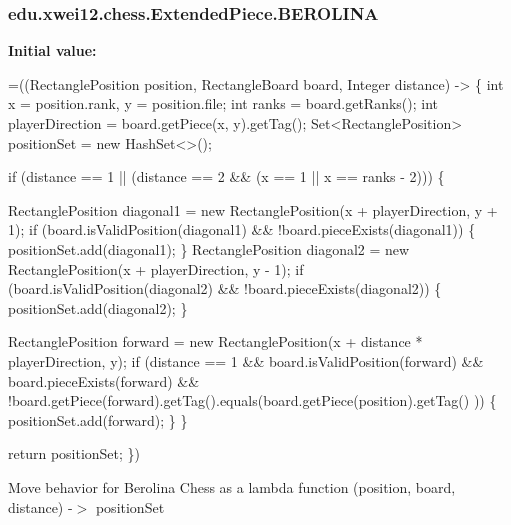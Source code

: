 \subsubsection[{\texorpdfstring{B\+E\+R\+O\+L\+I\+NA}{BEROLINA}}]{\setlength{\rightskip}{0pt plus 5cm}edu.\+xwei12.\+chess.\+Extended\+Piece.\+B\+E\+R\+O\+L\+I\+NA}\hypertarget{enumedu_1_1xwei12_1_1chess_1_1_extended_piece_ab5339557b124dc900e571d2d8451409e}{}\label{enumedu_1_1xwei12_1_1chess_1_1_extended_piece_ab5339557b124dc900e571d2d8451409e}
{\bfseries Initial value\+:}
\begin{DoxyCode}
=((RectanglePosition position, RectangleBoard board, Integer distance) -> \{
        \textcolor{keywordtype}{int} x = position.rank, y = position.file;
        \textcolor{keywordtype}{int} ranks = board.getRanks();
        \textcolor{keywordtype}{int} playerDirection = board.getPiece(x, y).getTag();
        Set<RectanglePosition> positionSet = \textcolor{keyword}{new} HashSet<>();

        
        \textcolor{keywordflow}{if} (distance == 1 || (distance == 2 && (x == 1 || x == ranks - 2))) \{

            
            RectanglePosition diagonal1 = \textcolor{keyword}{new} RectanglePosition(x + playerDirection, y + 1);
            \textcolor{keywordflow}{if} (board.isValidPosition(diagonal1) && !board.pieceExists(diagonal1)) \{
                positionSet.add(diagonal1);
            \}
            RectanglePosition diagonal2 = \textcolor{keyword}{new} RectanglePosition(x + playerDirection, y - 1);
            \textcolor{keywordflow}{if} (board.isValidPosition(diagonal2) && !board.pieceExists(diagonal2)) \{
                positionSet.add(diagonal2);
            \}

            
            RectanglePosition forward = \textcolor{keyword}{new} RectanglePosition(x + distance * playerDirection, y);
            \textcolor{keywordflow}{if} (distance == 1 && board.isValidPosition(forward) && board.pieceExists(forward)
                              && !board.getPiece(forward).getTag().equals(board.getPiece(position).getTag()
      )) \{
                positionSet.add(forward);
            \}
        \}

        \textcolor{keywordflow}{return} positionSet;
    \})
\end{DoxyCode}
Move behavior for Berolina Chess as a lambda function (position, board, distance) -\/$>$ position\+Set 
